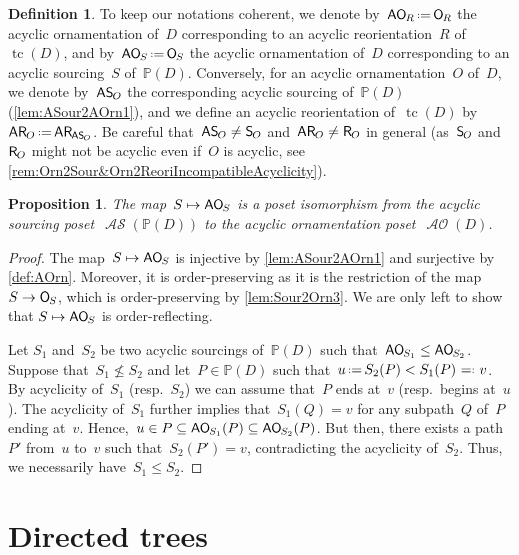 \documentclass{amsart}
\newtheorem{proposition}[theorem]{Proposition}
\theoremstyle{definition}
\newtheorem{definition}[theorem]{Definition}
\renewcommand{\c}[1]{\mathcal{#1}} %
\newcommand{\eqdef}{\mbox{\,\raisebox{0.2ex}{\scriptsize\ensuremath{\mathrm:}}\ensuremath{=}\,}} %
\newcommand{\defeq}{\mbox{~\ensuremath{=}\raisebox{0.2ex}{\scriptsize\ensuremath{\mathrm:}} }} %
\DeclareMathOperator{\tc}{tc} %
\newcommand{\mymap}[2]{\mathsf{#1}_{\hspace{-.7pt}#2}}
\newcommand{\orn}[1]{\mymap{O}{#1}}  %
\DeclareMathOperator{\AOrn}{\c{AO}}  %
\newcommand{\aorn}[1]{\mymap{AO}{#1}}  %
\newcommand{\reori}[1]{\mymap{R}{#1}}  %
\newcommand{\areori}[1]{\mymap{AR}{#1}}  %
\newcommand{\sour}[1]{\mymap{S}{#1}}  %
\DeclareMathOperator{\ASour}{\mathcal{AS}}  %
\newcommand{\asour}[1]{\mymap{AS}{#1}}  %
\newcommand{\PP}{\mathbb P} %
\begin{document}
\begin{definition}
\label{def:moreNotations}
To keep our notations coherent, we denote by~$\aorn{R} \eqdef \orn{R}$ the acyclic ornamentation of~$D$ corresponding to an acyclic reorientation~$R$ of~$\tc(D)$, and by~$\aorn{S} \eqdef \orn{S}$ the acyclic ornamentation of~$D$ corresponding to an acyclic sourcing~$S$ of~$\PP(D)$.
Conversely, for an acyclic ornamentation~$O$ of~$D$, we denote by~$\asour{O}$ the corresponding acyclic sourcing of~$\PP(D)$ (\cref{lem:ASour2AOrn1}), and we define an acyclic reorientation of~$\tc(D)$ by~$\areori{O} \eqdef \areori{\asour{O}}$.
Be careful that~$\asour{O} \ne \sour{O}$ and~$\areori{O} \ne \reori{O}$ in general (as~$\sour{O}$ and~$\reori{O}$ might not be acyclic even if~$O$ is acyclic, see \cref{rem:Orn2Sour&Orn2ReoriIncompatibleAcyclicity}).
\end{definition}

\begin{proposition}
\label{prop:ASour2AOrn}
The map~$S \mapsto \aorn{S}$ is a poset isomorphism from the acyclic sourcing poset~$\ASour(\PP(D))$ to the acyclic ornamentation poset~$\AOrn(D)$.
\end{proposition}

\begin{proof}
The map~$S \mapsto \aorn{S}$ is injective by \cref{lem:ASour2AOrn1} and surjective by \cref{def:AOrn}.
Moreover, it is order-preserving as it is the restriction of the map $S \to \orn{S}$, which is order-preserving by \cref{lem:Sour2Orn3}.
We are only left to show that $S \mapsto \aorn{S}$ is order-reflecting.

Let $S_1$ and~$S_2$ be two acyclic sourcings of~$\PP(D)$ such that~$\aorn{S_1} \leq \aorn{S_2}$.
Suppose that~$S_1 \not\leq S_2$ and let~$P \in \PP(D)$ such that~$u \eqdef S_2(P) < S_1(P) \defeq v$.
By acyclicity of~$S_1$ (resp.~$S_2$) we can assume that~$P$ ends at~$v$ (resp.~begins at~$u$).
The acyclicity of~$S_1$ further implies that~$S_1(Q) = v$ for any subpath~$Q$ of~$P$ ending at~$v$.
Hence,~$u \in P \subseteq \aorn{S_1}(P) \subseteq \aorn{S_2}(P)$.
But then, there exists a path~$P'$ from~$u$ to~$v$ such that~$S_2(P') = v$, contradicting the acyclicity of~$S_2$.
Thus, we necessarily have~$S_1 \leq S_2$.
\end{proof}


\section{Directed trees}
\label{sec:trees}
\end{document}
